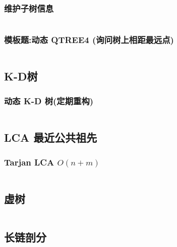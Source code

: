 \documentclass[a4paper, twoside]{article}
\begin{document}
\begin{multicols}{2}
				\subsubsection{维护子树信息}
					\inputminted{cpp}{../src/datastructure/LCT维护子树信息.cpp}
					
				\subsubsection[模板题:动态QTREE4]{模板题:动态 QTREE4 (询问树上相距最远点)}
						\inputminted{cpp}{../src/datastructure/动态QTREE4.cpp}
	
			\subsection{K-D树}

				\subsubsection{动态 K-D 树(定期重构)}
					\inputminted{cpp}{../src/datastructure/动态KD树.cpp}
	
	
	
			
			\subsection{LCA 最近公共祖先}
				\subsubsection{Tarjan LCA $O(n + m)$}
					\inputminted{cpp}{../src/datastructure/tarjanlca.cpp}

			\subsection{虚树}
				\inputminted{cpp}{../src/datastructure/虚树.cpp}
	
			\subsection{长链剖分}
				\inputminted{cpp}{../src/datastructure/长链剖分.cpp}
	

\end{multicols}
\end{document}
